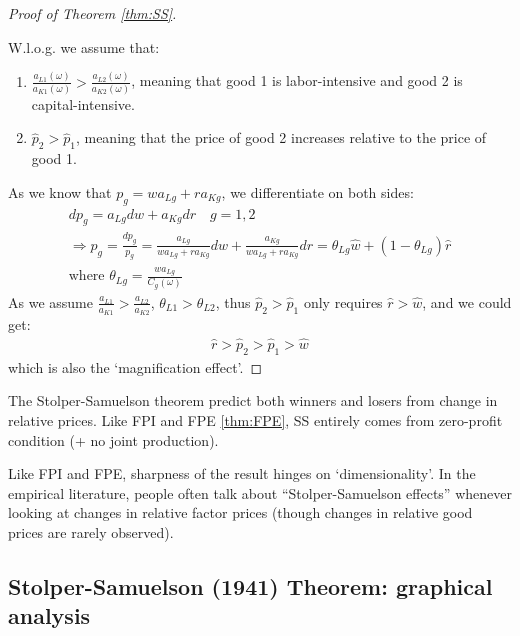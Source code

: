 \begin{proof}[Proof of Theorem \ref{thm:SS}]
    \

    W.l.o.g. we assume that:
    \begin{enumerate}
        \item $\frac{a_{L1}(\omega)}{a_{K1}(\omega)} > \frac{a_{L2}(\omega)}{a_{K2}(\omega)}$, meaning that good 1 is labor-intensive and good 2 is capital-intensive.
        \item $\hat{p}_2 > \hat{p}_1$, meaning that the price of good 2 increases relative to the price of good 1.
    \end{enumerate}
    As we know that $p_g = w a_{Lg} + r a_{Kg}$, we differentiate on both sides:
    \begin{gather*}
        d p_g = a_{Lg} dw + a_{Kg} dr \quad g = 1,2 \\
        \Rightarrow \hat{p}_g = \frac{d p_g}{p_g} = \frac{a_{Lg}}{w a_{Lg} + r a_{Kg}} d w + \frac{a_{Kg}}{w a_{Lg} + r a_{Kg}} d r = \theta_{Lg} \hat{w} + (1-\theta_{Lg} ) \hat{r} \\
        \text{where } \theta_{Lg} =  \frac{w a_{Lg}}{C_g(\omega)}
    \end{gather*}
    As we assume $\frac{a_{L1}}{a_{K1}} > \frac{a_{L2}}{a_{K2}}$, $\theta_{L1} > \theta_{L2}$,
    thus $\hat{p}_2 > \hat{p}_1$ only requires $\hat{r} > \hat{w}$, and we could get:
    \begin{gather*}
        \hat{r} > \hat{p}_2 > \hat{p}_1 > \hat{w}
    \end{gather*}
    which is also the `magnification effect'.
\end{proof}

The Stolper-Samuelson theorem predict both winners and losers from change in relative prices.
Like FPI and FPE \ref{thm:FPE}, SS entirely comes from zero-profit condition (+ no
joint production).

Like FPI and FPE, sharpness of the result hinges on `dimensionality'.
In the empirical literature, people often talk about ``Stolper-Samuelson
effects'' whenever looking at changes in relative factor prices (though
changes in relative good prices are rarely observed).

\subsection{Stolper-Samuelson (1941) Theorem: graphical analysis}




